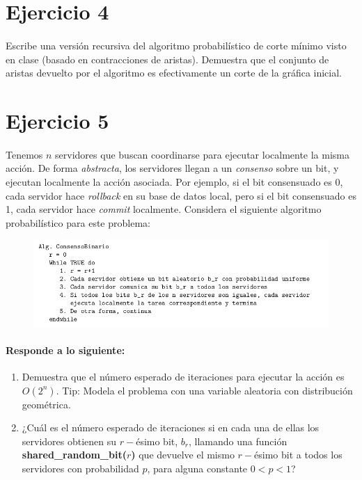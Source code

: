 \documentclass[12pt]{article}
\begin{document}
\section{Ejercicio 4}
\paragraph{} Escribe una versión recursiva del algoritmo probabilístico de corte mínimo visto en clase (basado en contracciones de aristas). Demuestra que el conjunto de aristas devuelto por el algoritmo es efectivamente un corte de la gráfica inicial.
\section{Ejercicio 5}
\paragraph{} Tenemos $n$ servidores que buscan coordinarse para ejecutar localmente la misma acción. De forma \textit{abstracta}, los servidores llegan a un \textit{consenso} sobre un bit, y ejecutan localmente la acción asociada. Por ejemplo, si el bit consensuado es 0, cada servidor hace \textit{rollback} en su base de datos local, pero si el bit consensuado es 1, cada servidor hace \textit{commit} localmente. Considera el siguiente algoritmo probabilístico para este problema:
\begin{figure}[h]
	\begin{center}
		\includegraphics[width=\textwidth]{AlgoProba}
	\end{center}
\end{figure}
\paragraph{Responde a lo siguiente:}
\begin{enumerate}
	\item Demuestra que el número esperado de iteraciones para ejecutar la acción es $O(2^n)$. Tip: Modela el problema con una variable aleatoria con distribución geométrica.
	\item ¿Cuál es el número esperado de iteraciones si en cada una de ellas los servidores obtienen su $r-$ésimo bit, $b_r$, llamando una función \textbf{shared\_random\_bit($r$)} que devuelve el mismo $r-$ésimo bit a todos los servidores con probabilidad $p$, para alguna constante $0 < p < 1$?
\end{enumerate}
\end{document}

